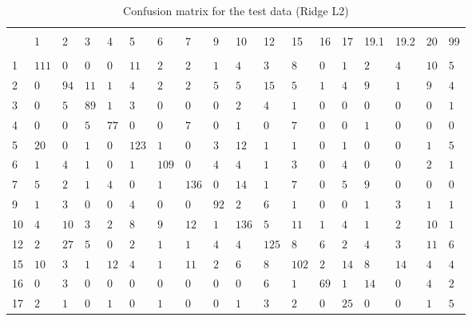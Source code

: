 
\begin{table}[!htbp] \centering 
  \caption{Confusion matrix for the test data (Ridge L2)} 
  \label{tab:confusion-mat-ridge} 
\begin{tabularx}{\textwidth}{XXXXXXXXXXXXXXXXXX} 
\\[-1.8ex]\hline 
\hline \\[-1.8ex] 
 & 1 & 2 & 3 & 4 & 5 & 6 & 7 & 9 & 10 & 12 & 15 & 16 & 17 & 19.1 & 19.2 & 20 & 99 \\ 
\hline \\[-1.8ex] 
1 & $111$ & $0$ & $0$ & $0$ & $11$ & $2$ & $2$ & $1$ & $4$ & $3$ & $8$ & $0$ & $1$ & $2$ & $4$ & $10$ & $5$ \\ 
2 & $0$ & $94$ & $11$ & $1$ & $4$ & $2$ & $2$ & $5$ & $5$ & $15$ & $5$ & $1$ & $4$ & $9$ & $1$ & $9$ & $4$ \\ 
3 & $0$ & $5$ & $89$ & $1$ & $3$ & $0$ & $0$ & $0$ & $2$ & $4$ & $1$ & $0$ & $0$ & $0$ & $0$ & $0$ & $1$ \\ 
4 & $0$ & $0$ & $5$ & $77$ & $0$ & $0$ & $7$ & $0$ & $1$ & $0$ & $7$ & $0$ & $0$ & $1$ & $0$ & $0$ & $0$ \\ 
5 & $20$ & $0$ & $1$ & $0$ & $123$ & $1$ & $0$ & $3$ & $12$ & $1$ & $1$ & $0$ & $1$ & $0$ & $0$ & $1$ & $5$ \\ 
6 & $1$ & $4$ & $1$ & $0$ & $1$ & $109$ & $0$ & $4$ & $4$ & $1$ & $3$ & $0$ & $4$ & $0$ & $0$ & $2$ & $1$ \\ 
7 & $5$ & $2$ & $1$ & $4$ & $0$ & $1$ & $136$ & $0$ & $14$ & $1$ & $7$ & $0$ & $5$ & $9$ & $0$ & $0$ & $0$ \\ 
9 & $1$ & $3$ & $0$ & $0$ & $4$ & $0$ & $0$ & $92$ & $2$ & $6$ & $1$ & $0$ & $0$ & $1$ & $3$ & $1$ & $1$ \\ 
10 & $4$ & $10$ & $3$ & $2$ & $8$ & $9$ & $12$ & $1$ & $136$ & $5$ & $11$ & $1$ & $4$ & $1$ & $2$ & $10$ & $1$ \\ 
12 & $2$ & $27$ & $5$ & $0$ & $2$ & $1$ & $1$ & $4$ & $4$ & $125$ & $8$ & $6$ & $2$ & $4$ & $3$ & $11$ & $6$ \\ 
15 & $10$ & $3$ & $1$ & $12$ & $4$ & $1$ & $11$ & $2$ & $6$ & $8$ & $102$ & $2$ & $14$ & $8$ & $14$ & $4$ & $4$ \\ 
16 & $0$ & $3$ & $0$ & $0$ & $0$ & $0$ & $0$ & $0$ & $0$ & $6$ & $1$ & $69$ & $1$ & $14$ & $0$ & $4$ & $2$ \\ 
17 & $2$ & $1$ & $0$ & $1$ & $0$ & $1$ & $0$ & $0$ & $1$ & $3$ & $2$ & $0$ & $25$ & $0$ & $0$ & $1$ & $5$ \\ 

\end{tabularx}
\end{table}
